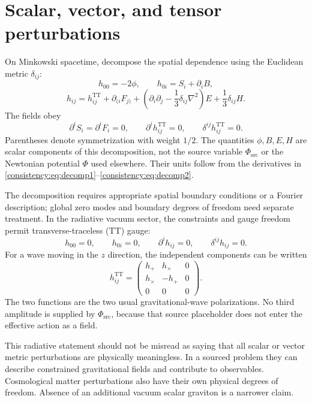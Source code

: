 \documentclass[11pt,oneside]{report}
\newcommand{\PhiSrc}{\Phi_{\mathrm{src}}}
\newcommand{\Ph}{\Phi}
\newcommand{\TT}{\mathrm{TT}}
\theoremstyle{remark}
\numberwithin{definition}{chapter}
\numberwithin{proposition}{chapter}
\numberwithin{remark}{chapter}
\begin{document}
\section{Scalar, vector, and tensor perturbations}
On Minkowski spacetime, decompose the spatial dependence using the Euclidean metric $\delta_{ij}$:
\begin{equation}
h_{00}=-2\phi,\qquad h_{0i}=S_i+\partial_i B,
\label{consistency:eq:decomp1}
\end{equation}
\begin{equation}
h_{ij}=h^{\TT}_{ij}+\partial_{(i}F_{j)}+
\left(\partial_i\partial_j-\frac13\delta_{ij}\nabla^2\right)E
+\frac13\delta_{ij}H.
\label{consistency:eq:decomp2}
\end{equation}
The fields obey
\begin{equation}
\partial^iS_i=\partial^iF_i=0,\qquad
\partial^ih^{\TT}_{ij}=0,\qquad \delta^{ij}h^{\TT}_{ij}=0.
\label{consistency:eq:ttconditions}
\end{equation}
Parentheses denote symmetrization with weight $1/2$. The quantities $\phi,B,E,H$ are scalar components of this decomposition, not the source variable $\PhiSrc$ or the Newtonian potential $\Ph$ used elsewhere. Their units follow from the derivatives in \eqref{consistency:eq:decomp1}--\eqref{consistency:eq:decomp2}.

The decomposition requires appropriate spatial boundary conditions or a Fourier description; global zero modes and boundary degrees of freedom need separate treatment. In the radiative vacuum sector, the constraints and gauge freedom permit transverse-traceless (TT) gauge:
\begin{equation}
h_{00}=0,\qquad h_{0i}=0,\qquad
\partial^ih_{ij}=0,\qquad \delta^{ij}h_{ij}=0.
\label{consistency:eq:ttgauge}
\end{equation}
For a wave moving in the $z$ direction, the independent components can be written
\begin{equation}
h^{\TT}_{ij}=
\begin{pmatrix}
h_+&h_\times&0\\
h_\times&-h_+&0\\
0&0&0
\end{pmatrix}.
\end{equation}
The two functions are the two usual gravitational-wave polarizations. No third amplitude is supplied by $\PhiSrc$, because that source placeholder does not enter the effective action as a field.

This radiative statement should not be misread as saying that all scalar or vector metric perturbations are physically meaningless. In a sourced problem they can describe constrained gravitational fields and contribute to observables. Cosmological matter perturbations also have their own physical degrees of freedom. Absence of an additional vacuum scalar graviton is a narrower claim.
\end{document}
